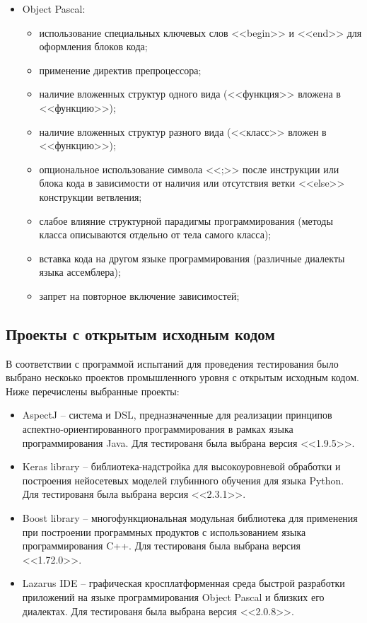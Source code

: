 \begin{itemize}[noitemsep]
  \item Object Pascal:
    \begin{itemize}[noitemsep]
      \item использование специальных ключевых слов <<begin>> и <<end>> для оформления блоков кода;
      \item применение директив препроцессора;
      \item наличие вложенных структур одного вида (<<функция>> вложена в <<функцию>>);
      \item наличие вложенных структур разного вида (<<класс>> вложен в <<функцию>>);
      \item опциональное использование символа <<;>> после инструкции или блока кода в зависимости от наличия или отсутствия ветки <<else>> конструкции ветвления;
      \item слабое влияние структурной парадигмы программирования (методы класса описываются отдельно от тела самого класса);
      \item вставка кода на другом языке программирования (различные диалекты языка ассемблера);
      \item запрет на повторное включение зависимостей;
    \end{itemize}
\end{itemize}

\subsection{Проекты с открытым исходным кодом}

В соответствии с программой испытаний для проведения тестирования было выбрано нескоько проектов промышленного уровня с открытым исходным кодом.
Ниже перечислены выбранные проекты:

\begin{itemize}[noitemsep]
  \item AspectJ       \cite{aspectj} --
  система и DSL, предназначенные для реализации принципов аспектно-ориентированного программирования в рамках языка программирования Java.
  Для тестированя была выбрана версия <<1.9.5>>.

  \item Keras library \cite{keras} --
  библиотека-надстройка для высокоуровневой обработки и построения нейосетевых моделей глубинного обучения для языка Python.
  Для тестированя была выбрана версия <<2.3.1>>.

  \item Boost library \cite{boost} --
  многофункциональная модульная библиотека для применения при построении программных продуктов с использованием языка программирования C++.
  Для тестированя была выбрана версия <<1.72.0>>.

  \item Lazarus IDE   \cite{lazarus} --
  графическая кросплатформенная среда быстрой разработки приложений на языке программирования Object Pascal и близких его диалектах.
  Для тестированя была выбрана версия <<2.0.8>>.
\end{itemize}

